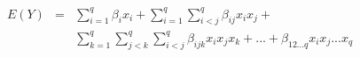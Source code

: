 

\[
\begin{array}{lll} E(Y) & = & \sum_{i=1}^{q}{\beta_{i}x_{i}} + \sum_{i=1}^{q}{\sum_{i < j}^{q}{\beta_{ij}x_{i}x_{j}}} + \\ & & \sum_{k=1}^{q}{\sum_{j < k}^{q}{\sum_{i < j}^{q}{\beta_{ijk}x_{i}x_{j}x_{k} + ... + \beta_{12...q}x_{i}x_{j} ... x_{q}}}} \end{array}
\]


